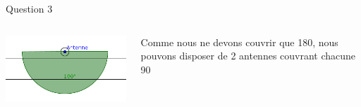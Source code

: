 \documentclass{beamer}
\begin{document}
\begin{frame}{Question 3}
	\begin{columns}
		\begin{column}{0.40\textwidth}
			\begin{center}
	    		\includegraphics[scale=0.9]{question3-2.png}
        		\end{center}
        	\end{column}
        	\begin{column}{0.40\textwidth}
	    Comme nous ne devons couvrir que \unit{180}{\degree}, nous pouvons disposer de 2 antennes couvrant chacune \unit{90}{\degree}
	   
        	\end{column}
        	\end{columns}
\end{frame}
\end{document}
